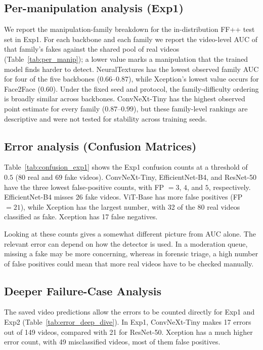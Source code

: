 \subsection{Per-manipulation analysis (Exp1)}
We report the manipulation-family breakdown for the in-distribution FF++ test set in Exp1. For each backbone and each family we report the video-level AUC of that family's fakes against the shared pool of real videos (Table~\ref{tab:per_manip}); a lower value marks a manipulation that the trained model finds harder to detect. NeuralTextures has the lowest observed family AUC for four of the five backbones ($0.66$--$0.87$), while Xception's lowest value occurs for Face2Face ($0.60$). Under the fixed seed and protocol, the family-difficulty ordering is broadly similar across backbones. ConvNeXt-Tiny has the highest observed point estimate for every family ($0.87$--$0.99$), but these family-level rankings are descriptive and were not tested for stability across training seeds.



\subsection{Error analysis (Confusion Matrices)}
Table~\ref{tab:confusion_exp1} shows the Exp1 confusion counts at a threshold of $0.5$ ($80$ real and $69$ fake videos). ConvNeXt-Tiny, EfficientNet-B4, and ResNet-50 have the three lowest false-positive counts, with FP $=3$, $4$, and $5$, respectively. EfficientNet-B4 misses 26 fake videos. ViT-Base has more false positives (FP $=21$), while Xception has the largest number, with 32 of the 80 real videos classified as fake. Xception has 17 false negatives.

Looking at these counts gives a somewhat different picture from AUC alone. The relevant error can depend on how the detector is used. In a moderation queue, missing a fake may be more concerning, whereas in forensic triage, a high number of false positives could mean that more real videos have to be checked manually.



\subsection{Deeper Failure-Case Analysis}

The saved video predictions allow the errors to be counted directly for Exp1 and Exp2 (Table~\ref{tab:error_deep_dive}). In Exp1, ConvNeXt-Tiny makes 17 errors out of 149 videos, compared with 21 for ResNet-50. Xception has a much higher error count, with 49 misclassified videos, most of them false positives.

